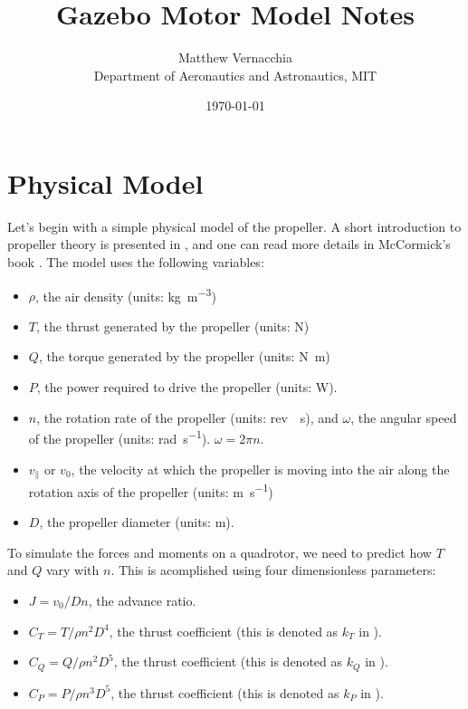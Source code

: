 \documentclass[12pt]{article}
\title{Gazebo Motor Model Notes}
\author{Matthew Vernacchia\\
Department of Aeronautics and Astronautics, MIT}
\date{\today}
\begin{document}
\maketitle

\section{Physical Model}
Let's begin with a simple physical model of the propeller. A short introduction to propeller theory is presented in \cite{Unified}, and one can read more details in McCormick's book \cite{McCormick1979}. The model uses the following variables:

\begin{itemize}
    \item $\rho$, the air density (units: \si{\kilogram\per\meter\cubed})
    \item $T$, the thrust generated by the propeller (units: \si{\newton})
    \item $Q$, the torque generated by the propeller (units: \si{\newton\meter})
    \item $P$, the power required to drive the propeller (units: \si{\watt}).
    \item $n$, the rotation rate of the propeller (units: \si{rev \per\second}), and $\omega$, the angular speed of the propeller (units: \si{\radian\per\second}). $\omega = 2 \pi n$.
    \item $v_\parallel$ or $v_0$, the velocity at which the propeller is moving into the air along the rotation axis of the propeller (units: \si{\meter\per\second})
    \item $D$, the propeller diameter (units: \si{\meter}).
\end{itemize}

To simulate the forces and moments on a quadrotor, we need to predict how $T$ and $Q$ vary with $n$. This is acomplished using four dimensionless parameters:

\begin{itemize}
    \item $J = v_0 / D n$, the advance ratio.
    \item $C_T = T / \rho n^2 D^4$, the thrust coefficient (this is denoted as $k_T$ in \cite{Unified}).
    \item $C_Q = Q / \rho n^2 D^5$, the thrust coefficient (this is denoted as $k_Q$ in \cite{Unified}).
    \item $C_P = P / \rho n^3 D^5$, the thrust coefficient (this is denoted as $k_P$ in \cite{Unified}).
\end{itemize}
\end{document}
